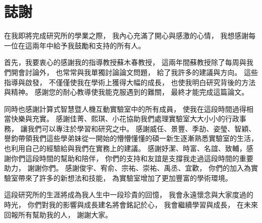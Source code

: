 \documentclass[class=NCU_thesis, crop=false]{standalone}
\begin{document}
\chapter{誌謝}

在我即將完成研究所的學業之際，
我內心充滿了開心與感激的心情，
我想感謝每一位在這兩年中給予我鼓勵和支持的所有人。

首先，我要衷心的感謝我的指導教授蘇木春教授，
這兩年間蘇教授除了每周與我們開會討論外，
也常常與我單獨討論論文問題，
給了我許多的建議與方向。
這些指導與啟發，
不僅僅使我在學術上獲得大幅的成長，
也使我明白研究背後的方法與精神。
感謝您的耐心教導使我能克服遇到的難關，
最終才能完成這篇論文。

同時也感謝計算式智慧暨人機互動實驗室中的所有成員，
使我在這段時間過得相當快樂與充實。
感謝佳菁、熙琪、小花協助我們處理實驗室大大小小的行政事務，
讓我們可以專注於學習和研究之中。
感謝威任、景豐、季劼、姿瑩、智穎、譽鈞帶領我們這些學弟妹從一開始的懵懵懂懂的碩一新生逐漸熟悉實驗室的生活，
也利用自己的經驗給與我們在實務上的建議。
感謝妤潔、時富、名誼、致輔，感謝你們這段時間的幫助和陪伴，
你們的支持和友誼是支撐我走過這段時間的重要助力，
謝謝你們。
感謝俊宇、宥俞、宗祐、崇祐、禹丞、宜歡，
你們的加入為實驗室帶來了許多的新想法和技能，
為實驗室增加了更加豐富的學術環境。

這段研究所的生涯將成為我人生中一段珍貴的回憶，
我會永遠懷念與大家度過的時光，
你們對我的影響與成長建名將會銘記於心，
我會繼續學習與成長，
在未來回報所有幫助我的人，
謝謝大家。
\end{document}
